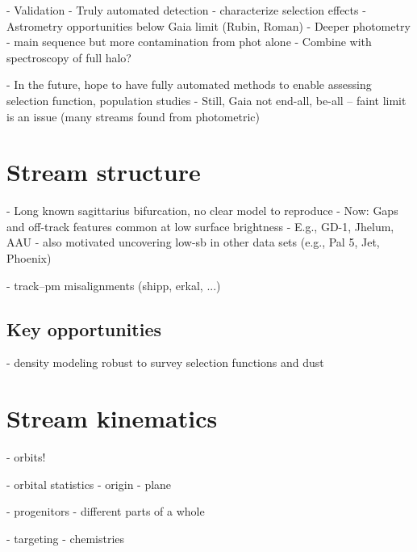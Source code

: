 \documentclass[final,5p,times,twocolumn,authoryear]{elsarticle}
\begin{document}
- Validation
- Truly automated detection - characterize selection effects
- Astrometry opportunities below Gaia limit (Rubin, Roman)
- Deeper photometry - main sequence but more contamination from phot alone
    - Combine with spectroscopy of full halo?

- In the future, hope to have fully automated methods to enable assessing selection function, population studies
- Still, Gaia not end-all, be-all -- faint limit is an issue (many streams found from photometric)


\section{Stream structure}
\label{sec:structure}
- Long known sagittarius bifurcation, no clear model to reproduce
- Now: Gaps and off-track features common at low surface brightness
- E.g., GD-1, Jhelum, AAU
- also motivated uncovering low-sb in other data sets (e.g., Pal 5, Jet, Phoenix)

- track--pm misalignments (shipp, erkal, ...)

\subsection{Key opportunities}
- density modeling robust to survey selection functions and dust


\section{Stream kinematics}
\label{sec:orbits}

- orbits!

- orbital statistics
- origin
- plane

- progenitors
- different parts of a whole

- targeting
- chemistries
\end{document}
